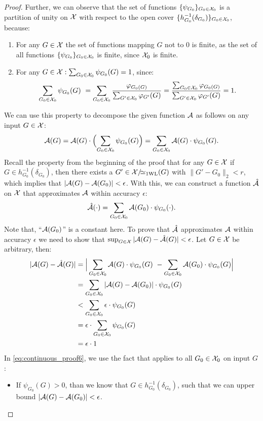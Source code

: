 \begin{proof}
    Further, we can observe that the set of functions $\{ \psi_{G_0}\}_{G_0 \in \mathcal{X}_0}$ is a partition of unity on $\mathcal{X}$ with respect to the open cover $\{ h_{G_0}^{-1}(\delta_{G_0}) \}_{G_0 \in \mathcal{X}_0}$, because:
    \begin{enumerate}
        \item For any $G \in \mathcal{X}$ the set of functions mapping $G$ not to $0$ is finite, as the set of all functions $\{ \psi_{G_0}\}_{G_0 \in \mathcal{X}_0}$ is finite, since $\mathcal{X}_0$ is finite.
        \item For any $G \in \mathcal{X}: \sum_{G_0 \in \mathcal{X}_0} \psi_{G_0}(G) = 1$, since: \begin{align*}
            \sum_{G_0 \in \mathcal{X}_0} \psi_{G_0}(G) \ = \sum_{G_0 \in \mathcal{X}_0} \frac{\varphi_{G_0(G)}}{\sum_{G' \in \mathcal{X}_0} \varphi_{G'}(G)} = \frac{\sum_{G_0 \in \mathcal{X}_0} \varphi_{G_0(G)}}{\sum_{G' \in \mathcal{X}_0} \varphi_{G'}(G)}= 1.
        \end{align*}
    \end{enumerate}
    We can use this property to decompose the given function $\mathcal{A}$ as follows on any input $G \in \mathcal{X}$:
    \begin{equation*}
        \mathcal{A}(G) = \mathcal{A}(G) \cdot \Bigl( \sum_{G_0 \in \mathcal{X}_0} \psi_{G_0}(G) \Bigr) = \sum_{G_0 \in \mathcal{X}_0} \mathcal{A}(G) \cdot \psi_{G_0}(G).
    \end{equation*}
    Recall the property from the beginning of the proof that for any $G \in \mathcal{X}$ if $G \in h_{G_0}^{-1}(\delta_{G_0})$, then there exists a $G' \in \mathcal{X}/\!{\simeq_{\text{1WL}}}(G)$ with $\| G' - G_0 \|_2 < r$, which implies that $|\mathcal{A}(G) - \mathcal{A}(G_0)| < \epsilon$. With this, we can construct a function $\hat{\mathcal{A}}$ on $\mathcal{X}$ that approximates $\mathcal{A}$ within accuracy $\epsilon$:
    \begin{equation*}
        \hat{\mathcal{A}}(\cdot) = \sum_{G_0 \in \mathcal{X}_0} \mathcal{A}(G_0) \cdot \psi_{G_0}(\cdot).
    \end{equation*}
    Note that, ``$\mathcal{A}(G_0)$'' is a constant here.
    To prove that $\hat{\mathcal{A}}$ approximates $\mathcal{A}$ within accuracy $\epsilon$ we need to show that $\sup_{G \in \mathcal{X}} |\mathcal{A}(G) - \hat{\mathcal{A}}(G) | < \epsilon$. Let $G \in \mathcal{X}$ be arbitrary, then:
    \begin{align}
        |\mathcal{A}(G) - \hat{\mathcal{A}}(G) | &= \Big|\sum_{G_0 \in \mathcal{X}_0} \mathcal{A}(G) \cdot \psi_{G_0}(G) \ - \sum_{G_0 \in \mathcal{X}_0} \mathcal{A}(G_0) \cdot \psi_{G_0}(G)\Big|\nonumber\\
        &= \sum_{G_0 \in \mathcal{X}_0} |\mathcal{A}(G) - \mathcal{A}(G_0) | \cdot \psi_{G_0}(G)\nonumber\\
        &< \sum_{G_0 \in \mathcal{X}_0} \epsilon \cdot \psi_{G_0}(G)\label{eq:continuous_proof6}\\
        &= \epsilon \cdot \sum_{G_0 \in \mathcal{X}_0} \psi_{G_0}(G)\nonumber\\
        &= \epsilon \cdot 1 \nonumber
    \end{align}
    In \autoref{eq:continuous_proof6}, we use the fact that applies to all $G_0 \in \mathcal{X}_0$ on input $G$:
    \begin{itemize}
        \item If $\psi_{G_0}(G) > 0$, than we know that $G \in 
        h_{G_0}^{-1}(\delta_{G_0})$, such that we can upper bound $|\mathcal{A}(G) - \mathcal{A}(G_0)| < \epsilon$.


\end{itemize}
\end{proof}
